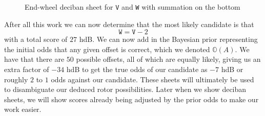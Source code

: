   \begin{figure}[H]
    \begin{center}
    \end{center}

    \caption{End-wheel deciban sheet for \texttt{V} and \texttt{W} with
    summation on the bottom }
  \end{figure}
  \noindent After all this work we can now determine that the most
  likely candidate is that
  \[
    \texttt{W} = \texttt{V} - 2
  \]
  with a total score of $27$ hdB. We can now add in the Bayesian
  prior representing the initial odds that any given offset is
  correct, which we denoted $\mathbb{O}(A)$. We have that there are
  $50$ possible offsets, all of which are equally likely, giving us
  an extra factor of $-34$ hdB to get the true odds of our candidate
  as $-7$ hdB or roughly $2$ to $1$ odds against our candidate. These
  sheets will ultimately be used to disambiguate our deduced rotor
  possibilities. Later when we show deciban sheets, we will show
  scores already being adjusted by the prior odds to make our work easier.

